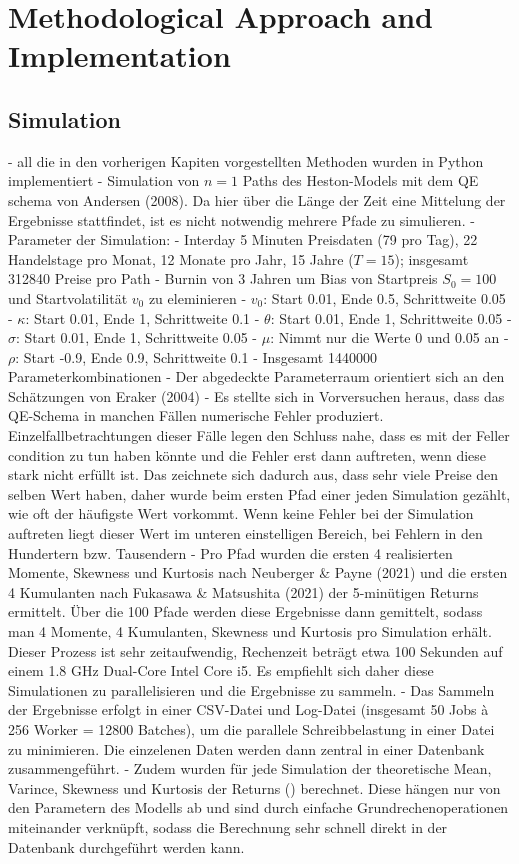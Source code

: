 \chapter{Methodological Approach and Implementation}
\label{sec:methodical_approach}

\section{Simulation}
- all die in den vorherigen Kapiten vorgestellten Methoden wurden in Python implementiert
- Simulation von $n=1$ Paths des Heston-Models mit dem QE schema von Andersen (2008). Da hier über die Länge der Zeit eine Mittelung der Ergebnisse stattfindet, ist es nicht notwendig mehrere Pfade zu simulieren.
- Parameter der Simulation:
    - Interday 5 Minuten Preisdaten (79 pro Tag), 22 Handelstage pro Monat, 12 Monate pro Jahr, 15 Jahre ($T = 15$); insgesamt 312840 Preise pro Path
    - Burnin von 3 Jahren um Bias von Startpreis $S_0 = 100$ und Startvolatilität $v_0$ zu eleminieren
    - $v_0$: Start 0.01, Ende 0.5, Schrittweite 0.05
    - $\kappa$: Start 0.01, Ende 1, Schrittweite 0.1
    - $\theta$: Start 0.01, Ende 1, Schrittweite 0.05
    - $\sigma$: Start 0.01, Ende 1, Schrittweite 0.05
    - $\mu$: Nimmt nur die Werte 0 und 0.05 an
    - $\rho$: Start -0.9, Ende 0.9, Schrittweite 0.1
    - Insgesamt 1440000 Parameterkombinationen
    - Der abgedeckte Parameterraum orientiert sich an den Schätzungen von Eraker (2004)
- Es stellte sich in Vorversuchen heraus, dass das QE-Schema in manchen Fällen numerische Fehler produziert. Einzelfallbetrachtungen dieser Fälle legen den Schluss nahe, dass es mit der Feller condition zu tun haben könnte und die Fehler erst dann auftreten, wenn diese stark nicht erfüllt ist. Das zeichnete sich dadurch aus, dass sehr viele Preise den selben Wert haben, daher wurde beim ersten Pfad einer jeden Simulation gezählt, wie oft der häufigste Wert vorkommt. Wenn keine Fehler bei der Simulation auftreten liegt dieser Wert im unteren einstelligen Bereich, bei Fehlern in den Hundertern bzw. Tausendern
- Pro Pfad wurden die ersten 4 realisierten Momente, Skewness und Kurtosis nach Neuberger & Payne (2021) und die ersten 4 Kumulanten nach Fukasawa & Matsushita (2021) der 5-minütigen Returns ermittelt. Über die 100 Pfade werden diese Ergebnisse dann gemittelt, sodass man 4 Momente, 4 Kumulanten, Skewness und Kurtosis pro Simulation erhält. Dieser Prozess ist sehr zeitaufwendig, Rechenzeit beträgt etwa 100 Sekunden auf einem 1.8 GHz Dual-Core Intel Core i5. Es empfiehlt sich daher diese Simulationen zu parallelisieren und die Ergebnisse zu sammeln.
- Das Sammeln der Ergebnisse erfolgt in einer CSV-Datei und Log-Datei (insgesamt 50 Jobs à 256 Worker = 12800 Batches), um die parallele Schreibbelastung in einer Datei zu minimieren. Die einzelenen Daten werden dann zentral in einer Datenbank zusammengeführt.
- Zudem wurden für jede Simulation der theoretische Mean, Varince, Skewness und Kurtosis der Returns (\cite{okhrinDistributionalPropertiesContinuous2023}) berechnet. Diese hängen nur von den Parametern des Modells ab und sind durch einfache Grundrechenoperationen miteinander verknüpft, sodass die Berechnung sehr schnell direkt in der Datenbank durchgeführt werden kann.

